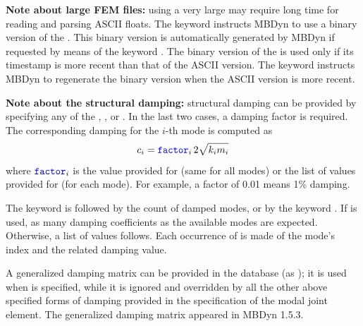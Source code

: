 \textbf{Note about large FEM files:}
using a very large  may require long time for
reading and parsing ASCII floats.
The keyword  instructs MBDyn to use a binary version
of the .
This binary version is automatically generated by MBDyn if requested
by means of the keyword .
The binary version of the  is used only if its
timestamp is more recent than that of the ASCII version.
The keyword  instructs MBDyn to regenerate the
binary version when the ASCII version is more recent.

\textbf{Note about the structural damping:}
structural damping can be provided by specifying any of the
, , 
or .
In the last two cases, a damping factor is required.
The corresponding damping for the $i$-th mode is computed as
\begin{displaymath}
	c_i = \textcolor{blue}{\texttt{factor}}_i \, 2 \sqrt{k_i m_i}
\end{displaymath}
where $\textcolor{blue}{\texttt{factor}}_i$ is the value provided
for  (same for all modes) or the list 
of values provided for  (for each mode).
For example, a factor of 0.01 means 1\% damping.

The keyword  is followed by the count of damped modes,
or by the keyword .
If  is used, as many damping coefficients as the available modes
are expected.
Otherwise, a list of  values follows.
Each occurrence of  is made of the mode's index
and the related damping value.

A generalized damping matrix can be provided in the database (as );
it is used when  is specified, while it is ignored
and overridden by all the other above specified forms
of damping provided in the specification of the modal joint element.
The generalized damping matrix appeared in MBDyn 1.5.3.


